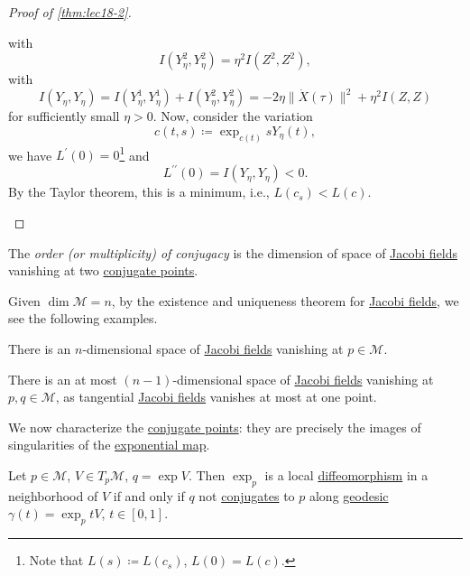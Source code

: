 \begin{proof}[Proof of \autoref{thm:lec18-2}]
\begin{enumerate}[(a)]
\[		      \]
		      with
		      \[
			      I(Y_\eta ^2, Y_\eta ^2) = \eta ^2 I(Z^2, Z^2),
		      \]
		      with
		      \[
			      I(Y_\eta , Y_\eta ) = I(Y_\eta ^1, Y_\eta ^1) + I(Y_\eta ^2, Y_\eta ^2) = -2 \eta \lVert \dot{X} (\tau ) \rVert ^2 + \eta ^2 I(Z, Z)
		      \]
		      for sufficiently small \(\eta > 0\). Now, consider the variation
		      \[
			      c(t, s) \coloneqq \exp _{c(t)} s Y_\eta (t),
		      \]
		      we have \(L^{\prime} (0) = 0\)\footnote{Note that \(L(s) \coloneqq L(c_s)\), \(L(0) = L(c)\).} and
		      \[
			      L^{\prime\prime} (0) = I(Y_\eta , Y_\eta ) < 0.
		      \]
		      By the Taylor theorem, this is a minimum, i.e., \(L(c_s) < L(c)\).
	\end{enumerate}
\end{proof}

\begin{definition}[Order]\label{def:order-of-conjugacy}
	The \emph{order (or multiplicity) of conjugacy} is the dimension of space of \hyperref[def:Jacobi-field]{Jacobi fields} vanishing at two \hyperref[def:conjugate-point]{conjugate points}.
\end{definition}

Given \(\dim \mathcal{M} = n\), by the existence and uniqueness theorem for \hyperref[def:Jacobi-field]{Jacobi fields}, we see the following examples.
\begin{eg}
	There is an \(n\)-dimensional space of \hyperref[def:Jacobi-field]{Jacobi fields} vanishing at \(p\in \mathcal{M} \).
\end{eg}

\begin{eg}
	There is an at most \((n-1)\)-dimensional space of \hyperref[def:Jacobi-field]{Jacobi fields} vanishing at \(p, q\in \mathcal{M} \), as tangential \hyperref[def:Jacobi-field]{Jacobi fields} vanishes at most at one point.
\end{eg}

We now characterize the \hyperref[def:conjugate-point]{conjugate points}: they are precisely the images of singularities of the \hyperref[def:exponential-map]{exponential map}.

\begin{proposition}
	Let \(p\in \mathcal{M} \), \(V\in T_p \mathcal{M} \), \(q = \exp V\). Then \(\exp _p\) is a local \hyperref[def:diffeomorphism]{diffeomorphism} in a neighborhood of \(V\) if and only if \(q\) not \hyperref[def:conjugate-point]{conjugates} to \(p\) along \hyperref[def:geodesic]{geodesic} \(\gamma (t) = \exp _p tV\), \(t\in [0, 1]\).
\end{proposition}


